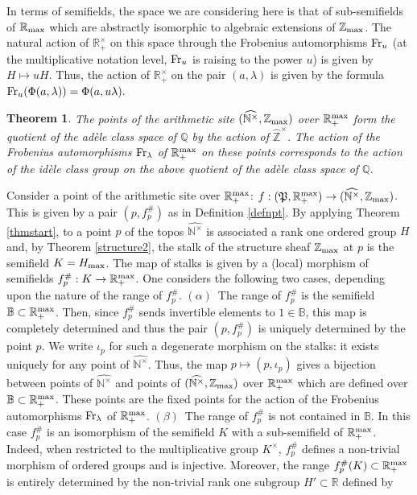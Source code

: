 \documentclass[noams,lp]{compositio}
\newtheorem{thm}{Theorem}[section] %
\def\B{{\mathbb B}}
\def\N{{\mathbb N}}
\def\Q{{\mathbb Q}}
\def\R{{\mathbb R}}
\def\Z{{\mathbb Z}}
\def\pt{\mathfrak P}
\def\zmax{{\Z_{\rm max}}}
\def\rmax{\R_+^{\rm max}}
\def\fr{{\rm Fr}}
\def\arith{{(\wnt,\bar \N)}}
\def\wnt{{\widehat{\N^{\times}}}}
\def\arith{{(\wnt,\zmax)}}
\def\hatz{{\hat\Z^\times}}
\begin{document}
In terms of semifields,   the space we are considering here is that of sub-semifields of $\R_{\rm max}$ which are abstractly isomorphic to algebraic extensions of $\Z_{\rm max}$. The natural action of $\R_+^\times$ on this space through the Frobenius automorphisms $\fr_u$ (at the multiplicative notation level, $\fr_u$ is raising to the power $u$) is given by $H\mapsto uH$.  Thus, the action of $\R_+^\times$ on the pair $(a,\lambda)$ is given by the formula
$
\fr_u(\Phi(a,\lambda))=\Phi(a,u\lambda).
$

\begin{thm} \label{structure3} The points of the arithmetic site  $\arith$ over $\rmax$ form the quotient of the ad\`ele class space of $\Q$ by the action of $\hatz$. The action of the Frobenius
automorphisms $\fr_\lambda$ of $\rmax$ on these points corresponds to the action of the id\`ele class group on the above quotient of the ad\`ele class space of $\Q$.
\end{thm}
\proof 
Consider a point of the arithmetic site over $\rmax$:  $f: (\pt,\rmax)\to\arith $. This is given by a pair $(p,f^\#_p)$ as in Definition \ref{defnpt}. By applying Theorem \ref{thmstart},  to a point $p$ of the topos $\wnt$ is associated a rank one ordered group $H$  and, by  Theorem \ref{structure2}, the stalk of the structure sheaf $\zmax$ at $p$ is the semifield $K=H_{\rm max}$.
The map of stalks  is given by a (local) morphism of semifields $f^\#_p:K\to \rmax$. One considers the following two cases, depending upon the nature of the range of $f^\#_p$. \newline
$(\alpha)$~The range of $f^\#_p$ is  the semifield $\B\subset \rmax$. Then, since $f^\#_p$ sends invertible elements to $1\in \B$, this map is completely determined and thus the pair $(p,f^\#_p)$ is uniquely determined by the point $p$. We write $\iota_p$ for such a degenerate morphism on the stalks: it exists uniquely for any point of $\wnt$. Thus, the  map  $p\mapsto (p,\iota_p)$ gives a bijection between points of $\wnt$ and  points of $\arith$ over $\rmax$ which are defined over $\B\subset \rmax$.  These points are the fixed points for the action of  the Frobenius
automorphisms $\fr_\lambda$ of $\rmax$.\newline
$(\beta)$~The range of $f^\#_p$ is not contained in  $\B$. In this case $f^\#_p$ is an isomorphism of the semifield $K$ with a sub-semifield of $\rmax$. Indeed, when restricted to the multiplicative group $K^\times$, $f^\#_p$ defines a non-trivial morphism of ordered groups and is  injective. Moreover, the range $f^\#_p(K)\subset \rmax$ is entirely determined by the non-trivial rank one subgroup $H'\subset \R$ defined by 
\end{document}
